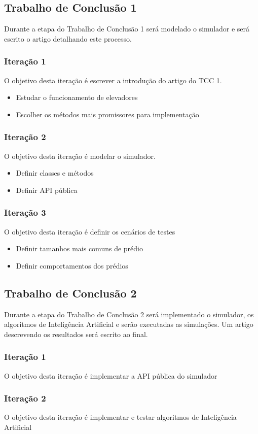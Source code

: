 \subsection{Trabalho de Conclusão 1}
Durante a etapa do Trabalho de Conclusão 1 será modelado o simulador e será escrito o artigo
detalhando este processo.

\subsubsection{Iteração 1}
O objetivo desta iteração é escrever a introdução do artigo do TCC 1.
\begin{itemize}
    \item Estudar o funcionamento de elevadores
    \item Escolher os métodos mais promissores para implementação
\end{itemize}

\subsubsection{Iteração 2}
O objetivo desta iteração é modelar o simulador.
\begin{itemize}
    \item Definir classes e métodos
    \item Definir API pública
\end{itemize}

\subsubsection{Iteração 3}
O objetivo desta iteração é definir os cenários de testes
\begin{itemize}
    \item Definir tamanhos mais comuns de prédio
    \item Definir comportamentos dos prédios
\end{itemize}

\subsection{Trabalho de Conclusão 2}
Durante a etapa do Trabalho de Conclusão 2 será implementado o simulador, os algoritmos de
Inteligência Artificial e serão executadas as simulações. Um artigo descrevendo
os resultados será escrito ao final.

\subsubsection{Iteração 1}
O objetivo desta iteração é implementar a API pública do simulador

\subsubsection{Iteração 2}
O objetivo desta iteração é implementar e testar algoritmos de
Inteligência Artificial